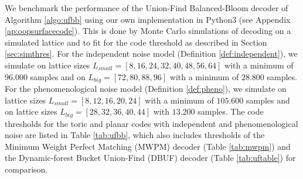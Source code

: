 We benchmark the performance of the Union-Find Balanced-Bloom decoder of Algorithm \ref{algo:ufbb} using our own implementation in Python3 (see Appendix \ref{ap:oopsurfacecode}). This is done by Monte Carlo simulations of decoding on a simulated lattice and to fit for the code threshold as described in Section \ref{sec:simthres}. For the independent noise model (Definition \ref{def:independent}), we simulate on lattice sizes $L_{small}=[8, 16, 24, 32, 40, 48, 56, 64]$ with a minimum of $96.000$ samples and on $L_{big}=[72, 80, 88, 96]$ with a minimum of $28.800$ samples. For the phenomenological noise model (Definition \ref{def:pheno}), we simulate on lattice sizes $L_{small}=[8,12,16,20,24]$ with a minimum of $105.600$ samples and on lattice sizes $L_{big}=[28, 32, 36, 40, 44]$ with $13.200$ samples. The code thresholds for the toric and planar codes with independent and phenomenological noise are listed in Table \ref{tab:ufbb}, which also includes thresholds of the Minimum Weight Perfect Matching (MWPM) decoder (Table \ref{tab:mwpm}) and the Dynamic-forest Bucket Union-Find (DBUF) decoder (Table \ref{tab:uftable}) for comparison.
